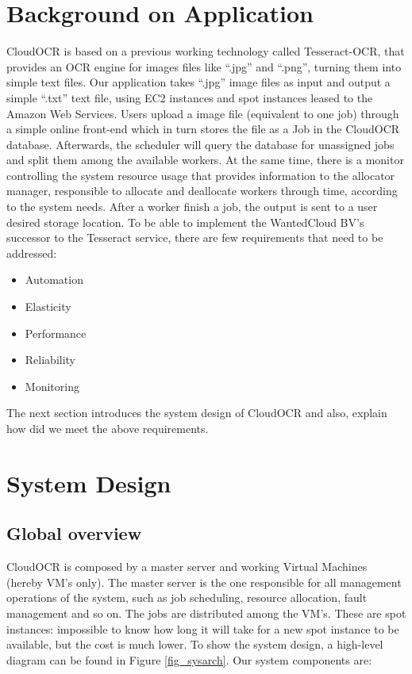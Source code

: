 \documentclass[a4paper]{IEEEtran}
\begin{document}
\section{Background on Application}
CloudOCR is based on a previous working technology called Tesseract-OCR, that provides an OCR engine for images files like ``.jpg'' and ``.png'', turning them into simple text files. Our application takes ``.jpg'' image files as input and output a simple ``.txt'' text file, using EC2 instances and spot instances leased to the Amazon Web Services. Users upload a image file (equivalent to one job) through a simple online front-end which in turn stores the file as a Job in the CloudOCR database. Afterwards, the scheduler will query the database for unassigned jobs and split them among the available workers. At the same time, there is a monitor controlling the system resource usage that provides information to the allocator manager, responsible to allocate and deallocate workers through time, according to the system needs. After a worker finish a job, the output is sent to a user desired storage location.
To be able to implement the WantedCloud BV's successor to the Tesseract service, there are few requirements that need to be addressed:
\begin{itemize}
	\item Automation
	\item Elasticity
	\item Performance
	\item Reliability
	\item Monitoring
\end{itemize}
The next section introduces the system design of CloudOCR and also, explain how did we meet the above requirements.

\section{System Design}

\subsection*{Global overview}
CloudOCR is composed by a master server and working Virtual Machines (hereby VM's only). The master server is the one responsible for all management operations of the system, such as job  scheduling, resource allocation, fault management and so on. The jobs are distributed among the VM's. These are spot instances: impossible to know how long it will take for a new spot instance to be available, but the cost is much lower.
To show the system design, a high-level diagram can be found in Figure \ref{fig_sysarch}.
Our system components are:
\end{document}
